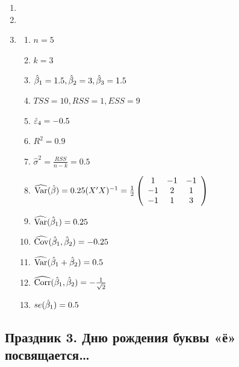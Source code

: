 \documentclass[12pt, a4paper]{article}\usepackage[]{graphicx}\usepackage[]{color}
\begin{document}
\begin{enumerate}
\item
\item
\item
\begin{enumerate}
\item $n = 5$
\item $k = 3$
\item $\hat{\beta}_1 = 1.5, \hat{\beta}_2 = 3, \hat{\beta}_3 = 1.5$
\item $TSS = 10, RSS = 1, ESS = 9$
\item $\hat{\varepsilon}_4 = -0.5$
\item $R^2 = 0.9$
\item $\hat{\sigma}^2 = \frac{RSS}{n-k} = 0.5$
\item $\widehat{\operatorname{Var}}(\hat{\beta}) = 0.25 (X'X)^{-1}=\frac{1}{2}\left(
\begin{array}{ccc}
1 & -1 & -1 \\
-1 & 2 & 1 \\
-1 & 1 & 3
\end{array}\right)$
\item $\widehat{\operatorname{Var}}(\hat{\beta}_1) = 0.25$
\item $\widehat{\operatorname{Cov}}(\hat{\beta}_1,\hat{\beta}_2) = -0.25$
\item $\widehat{\operatorname{Var}}(\hat{\beta}_1+\hat{\beta}_2) = 0.5$
\item $\widehat{\operatorname{Corr}}(\hat{\beta}_1,\hat{\beta}_2) = -\frac{1}{\sqrt{2}}$
\item $se(\hat{\beta}_1) = 0.5$
\end{enumerate}
\end{enumerate}


\subsection{Праздник 3. Дню рождения буквы «ё» посвящается\ldots}
\end{document}
